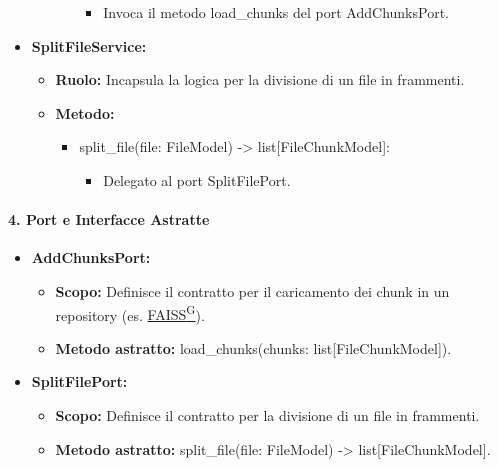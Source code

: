 \begin{itemize}
\begin{itemize}
\begin{itemize}
                \begin{itemize}
                    \item Invoca il metodo load\_chunks del port AddChunksPort.
                \end{itemize}
            \end{itemize}
        \end{itemize}
        \item \textbf{SplitFileService:}
        \begin{itemize}
            \item \textbf{Ruolo:} Incapsula la logica per la divisione di un file in frammenti.
            \item \textbf{Metodo:}
            \begin{itemize}
                \item split\_file(file: FileModel) -> list[FileChunkModel]:
                \begin{itemize}
                    \item Delegato al port SplitFilePort.
                \end{itemize}
            \end{itemize}
        \end{itemize}
    \end{itemize}

    \paragraph{4. Port e Interfacce Astratte}
    \begin{itemize}
        \item \textbf{AddChunksPort:}
        \begin{itemize}
            \item \textbf{Scopo:} Definisce il contratto per il caricamento dei chunk in un repository (es. \href{https://code7crusaders.github.io/docs/\href{https://code7crusaders.github.io/docs/PB/documentazione_interna/glossario.html#pb-product-baseline}{PB\textsuperscript{G}}/documentazione_interna/glossario.html#faiss}{FAISS\textsuperscript{G}}).
            \item \textbf{Metodo astratto:} load\_chunks(chunks: list[FileChunkModel]).
        \end{itemize}
        \item \textbf{SplitFilePort:}
        \begin{itemize}
            \item \textbf{Scopo:} Definisce il contratto per la divisione di un file in frammenti.
            \item \textbf{Metodo astratto:} split\_file(file: FileModel) -> list[FileChunkModel].
        \end{itemize}
    \end{itemize}

